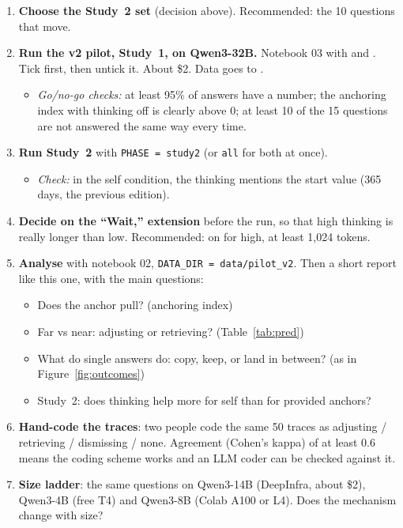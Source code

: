 \documentclass[11pt,a4paper]{article}
\begin{document}
\begin{enumerate}
  \item \textbf{Choose the Study~2 set} (decision above). Recommended: the 10 questions that move.
  \item \textbf{Run the v2 pilot, Study~1, on Qwen3-32B.} Notebook 03 with  and . Tick  first, then untick it. About \$2. Data goes to .
  \begin{itemize}
    \item \emph{Go/no-go checks:} at least 95\% of answers have a number; the anchoring index with thinking off is clearly above 0; at least 10 of the 15 questions are not answered the same way every time.
  \end{itemize}
  \item \textbf{Run Study~2} with \texttt{PHASE = study2} (or \texttt{all} for both at once).
  \begin{itemize}
    \item \emph{Check:} in the self condition, the thinking mentions the start value (365 days, the previous edition).
  \end{itemize}
  \item \textbf{Decide on the ``Wait,'' extension} before the run, so that high thinking is really longer than low. Recommended: on for high, at least 1,024 tokens.
  \item \textbf{Analyse} with notebook 02, \texttt{DATA\_DIR = data/pilot\_v2}. Then a short report like this one, with the main questions:
  \begin{itemize}
    \item Does the anchor pull? (anchoring index)
    \item Far vs near: adjusting or retrieving? (Table~\ref{tab:pred})
    \item What do single answers do: copy, keep, or land in between? (as in Figure~\ref{fig:outcomes})
    \item Study~2: does thinking help more for self than for provided anchors?
  \end{itemize}
  \item \textbf{Hand-code the traces}: two people code the same 50 traces as adjusting / retrieving / dismissing / none. Agreement (Cohen's kappa) of at least 0.6 means the coding scheme works and an LLM coder can be checked against it.
  \item \textbf{Size ladder}: the same questions on Qwen3-14B (DeepInfra, about \$2), Qwen3-4B (free T4) and Qwen3-8B (Colab A100 or L4). Does the mechanism change with size?

\end{enumerate}
\end{document}

